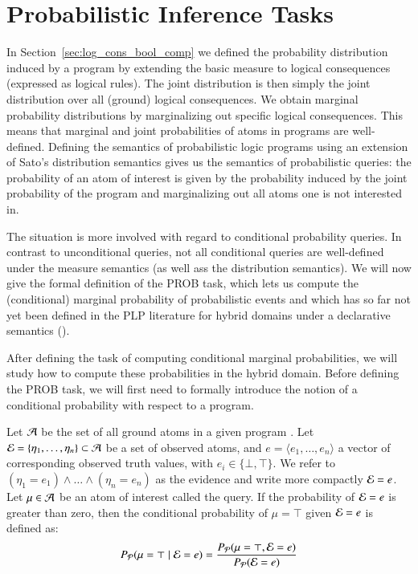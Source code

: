 \section{Probabilistic Inference Tasks} \label{sec:inference-tasks}

In Section~\ref{sec:log_cons_bool_comp} we defined the probability distribution induced by a \dfplpsty program by extending the basic measure to logical consequences (expressed as logical rules). The joint distribution is then simply the joint distribution over all (ground) logical consequences. We obtain marginal probability distributions by marginalizing out specific logical consequences.
This means that marginal and joint probabilities of atoms in \dfplpsty programs are well-defined. 
Defining the semantics of probabilistic logic programs using an extension of Sato's distribution semantics gives us the semantics of probabilistic queries: the probability of an atom of interest is given by the probability induced by the joint probability of the program and marginalizing out all atoms one is not interested in.

The situation is more involved with regard to conditional probability queries. In contrast to unconditional queries, not all conditional queries are well-defined under the measure semantics (as well ass the distribution semantics). We will now give the formal definition of the PROB task, which lets us compute the (conditional) marginal probability of probabilistic events and which has so far not yet been defined in the PLP literature for hybrid domains under a declarative semantics (\eg \citep{azzolini2021semantics}).

After defining the task of computing conditional marginal probabilities, we will study how to compute these probabilities in the hybrid domain. Before defining the PROB task, we will first need to formally introduce the notion of a conditional probability with respect to a  \dcproblogsty program.


\begin{definition}
\label{def:conditional_prob}
Let $\mathcal{A}$ be 
the set of all ground atoms in a given \dcproblogsty program \dcpprogram.
Let $\mathcal{E} = \{\eta_1,\ldots,\eta_n\} \subset \mathcal{A}$ be a set of observed atoms, and  $e=\langle e_1,\ldots, e_n\rangle$ a vector of corresponding  observed truth values, with $e_i\in \{\bot, \top \}$.
We refer to $(\eta_1=e_1) \wedge \ldots\wedge (\eta_n=e_n)$  as the evidence and write more compactly  $\mathcal{E} = e$.
Let  $\mu \in\mathcal{A}$ be an atom of interest called the query.
If the probability of $\mathcal{E} = e$ is greater than zero, then the conditional probability of $\mu=\top$ given $\mathcal{E}=e$ is defined as:
\begin{align}
    P_\mathcal{P}(\mu=\top \mid \mathcal{E}=e)= \frac{P_{\mathcal{P}}(\mu=\top, \mathcal{E}=e)}{P_\mathcal{P}(\mathcal{E}=e)} \label{eq:conditional_prob}
\end{align}
\end{definition}

